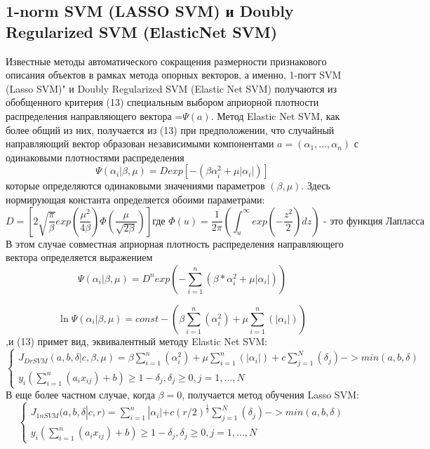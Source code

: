 \documentclass[../body.tex]{subfiles}
\begin{document}
\subsection{1-norm SVM (LASSO SVM) и Doubly Regularized SVM (ElasticNet SVM)}

Известные методы автоматического сокращения размерности признакового описания объектов в рамках метода опорных векторов, а именно, 1-погт SVM (Lasso
SVM)" и Doubly Regularized SVM (Elastic Net SVM) получаются из обобщенного критерия (13) специальным выбором априорной плотности распределения направляющего вектора =$\varPsi(a)$. Метод Elastic Net SVM, как более общий из них, получается из (13) при предположении, что случайный направляющий вектор образован независимыми компонентами $a=(\alpha_1, ..., \alpha_n)$
с одинаковыми плотностями распределения 
\[\varPsi(\alpha_i|\beta,\mu)= Dexp[-(\beta\alpha_i^2+\mu|\alpha_i|)]\]
которые определяются одинаковыми значениями параметров $(\beta, \mu)$. Здесь нормирующая константа определяется обоими параметрами:
$$D=[2\sqrt{\frac{\pi}{\beta}}exp(\frac{\mu^2}{4\beta})\Phi(\dfrac{\mu}{\sqrt{2\beta}})]\mbox{где }\Phi(u)=\frac{1}{2\pi}(\int_{u}^{\infty}exp(-\frac{z^2}{2})dz)\mbox{ - это функция Лапласса}$$
В этом случае совместная априорная плотность распределения направляющего вектора определяется выражением $$\varPsi(\alpha_i|\beta,\mu)=D^{n}exp(-\sum_{i=1}^{n}(\beta*\alpha^{2}_{i}+\mu|\alpha_{i}|))$$

\begin{equation}
\ln\varPsi(\alpha_i|\beta,\mu) = const - (\beta\sum_{i=1}^{n}(\alpha_i^2)+\mu\sum_{i=1}^{n}(|\alpha_i|))
\end{equation}
 ,и (13) примет вид, эквивалентный методу Elastic Net SVM: 
$$\left\{\begin{matrix}
J_{DrSVM}(a, b, \delta |c,\beta ,\mu ) = \beta\sum_{i=1}^{n}(\alpha_i^2)+\mu\sum_{i=1}^{n}(|\alpha_i|) + c\sum_{j=1}^{N}(\delta_j)->min(a,b,\delta)
	\\
	y_i(\sum_{i=1}^{n}(a_ix_{ij})+b)\geq1-\delta_j, \delta_j \geq 0, j= 1,...,N
\end{matrix}\right.$$
В еще более частном случае, когда $\beta = 0$, получается метод обучения Lasso SVM:
$$\left\{\begin{matrix}
	J_{1nSVM}(a, b, \delta |c,r ) = \sum_{i=1}^{n}|\alpha_i| + c(r/2)^{\frac{1}{2}}\sum_{j=1}^{N}(\delta_j)->min(a,b,\delta)
	\\
	y_i(\sum_{i=1}^{n}(a_ix_{ij})+b)\geq1-\delta_j, \delta_j \geq 0, j= 1,...,N
\end{matrix}\right.$$
\end{document}
